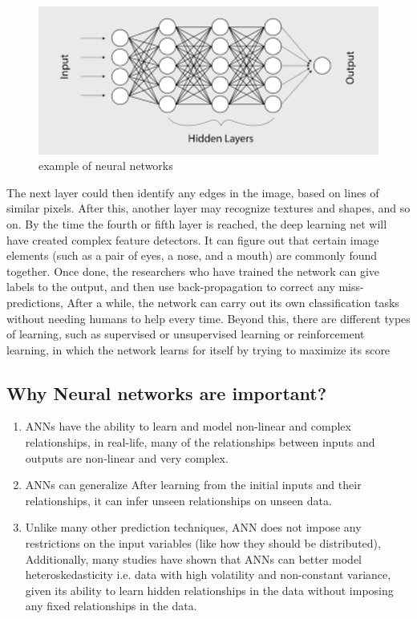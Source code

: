 \begin{figure}[H]
	\centering
	\includegraphics[width=1.0\textwidth]{CH1-introduction/sec3_neural_networks/nn.png}
	\caption{example of neural networks}
	\label{fig:nn}
\end{figure} 
The next layer could then identify any edges in the image, based on lines of similar pixels. After this, another layer may recognize textures and shapes, and so on. By the time the fourth or fifth layer is reached, the deep learning net will have created complex feature detectors. It can figure out that certain image elements (such as a pair of eyes, a nose, and a mouth) are commonly found together.\newline
Once done, the researchers who have trained the network can give labels to the output, and then use back-propagation to correct any miss-predictions, After a while, the network can carry out its own classification tasks without needing humans to help every time.
\newline
Beyond this, there are different types of learning, such as supervised or unsupervised learning or reinforcement learning, in which the network learns for itself by trying to maximize its score

\subsection{Why Neural networks are important? }
\begin{enumerate}
	\item ANNs have the ability to learn and model non-linear and complex relationships, in real-life, many of the relationships between inputs and outputs are non-linear and very complex.
	\item ANNs can generalize After learning from the initial inputs and their relationships, it can infer unseen relationships on unseen data.
	\item  Unlike many other prediction techniques, ANN does not impose any restrictions on the input variables (like how they should be distributed), Additionally, many studies have shown that ANNs can better model heteroskedasticity i.e. data with high volatility and non-constant variance, given its ability to learn hidden relationships in the data without imposing any fixed relationships in the data. 
	
\end{enumerate}
